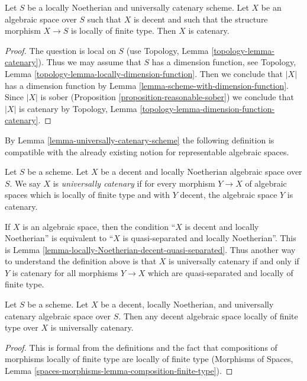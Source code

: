 \begin{lemma}
\label{lemma-universally-catenary-scheme}
Let $S$ be a locally Noetherian and universally catenary scheme.
Let $X$ be an algebraic space over $S$ such that $X$ is decent
and such that the structure morphism $X \to S$ is locally of
finite type. Then $X$ is catenary.
\end{lemma}

\begin{proof}
The question is local on $S$ (use
Topology, Lemma \ref{topology-lemma-catenary}).
Thus we may assume that $S$ has a
dimension function, see Topology, Lemma
\ref{topology-lemma-locally-dimension-function}.
Then we conclude that $|X|$ has a dimension function by
Lemma \ref{lemma-scheme-with-dimension-function}.
Since $|X|$ is sober (Proposition \ref{proposition-reasonable-sober})
we conclude that $|X|$ is catenary by
Topology, Lemma \ref{topology-lemma-dimension-function-catenary}.
\end{proof}

\noindent
By Lemma \ref{lemma-universally-catenary-scheme}
the following definition is compatible with the
already existing notion for representable algebraic spaces.

\begin{definition}
\label{definition-universally-catenary}
Let $S$ be a scheme. Let $X$ be a decent and locally Noetherian
algebraic space over $S$. We say $X$ is {\it universally catenary}
if for every morphism $Y \to X$ of algebraic spaces which is 
locally of finite type and with $Y$ decent, the algebraic space
$Y$ is catenary.
\end{definition}

\noindent
If $X$ is an algebraic space, then the condition
``$X$ is decent and locally Noetherian'' is equivalent to
``$X$ is quasi-separated and locally Noetherian''. This is
Lemma \ref{lemma-locally-Noetherian-decent-quasi-separated}.
Thus another way to understand the definition above is that $X$
is universally catenary if and only if $Y$ is catenary for
all morphisms $Y \to X$ which are quasi-separated and locally of finite type.

\begin{lemma}
\label{lemma-universally-catenary}
Let $S$ be a scheme. Let $X$ be a decent, locally Noetherian, and
universally catenary algebraic space over $S$. Then any decent algebraic
space locally of finite type over $X$ is universally catenary.
\end{lemma}

\begin{proof}
This is formal from the definitions and the fact that
compositions of morphisms locally of finite type are
locally of finite type (Morphisms of Spaces, Lemma
\ref{spaces-morphisms-lemma-composition-finite-type}).
\end{proof}

